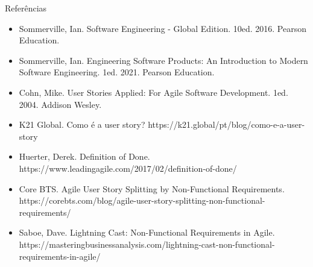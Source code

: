 \documentclass[11pt]{beamer}
\begin{document}
   \begin{frame}{Referências}
      \begin{itemize}
          \item Sommerville, Ian. Software Engineering - Global Edition. 10ed. 2016. Pearson Education.
          \item Sommerville, Ian. Engineering Software Products: An Introduction to Modern Software Engineering. 1ed. 2021. Pearson Education. 
          \item Cohn, Mike. User Stories Applied: For Agile Software Development. 1ed. 2004. Addison Wesley.
          \item K21 Global. Como é a user story? https://k21.global/pt/blog/como-e-a-user-story
          \item Huerter, Derek. Definition of Done. https://www.leadingagile.com/2017/02/definition-of-done/
          \item Core BTS. Agile User Story Splitting by Non-Functional Requirements. https://corebts.com/blog/agile-user-story-splitting-non-functional-requirements/
          \item Saboe, Dave. Lightning Cast: Non-Functional Requirements in Agile. https://masteringbusinessanalysis.com/lightning-cast-non-functional-requirements-in-agile/
      \end{itemize}
    \end{frame}
\end{document}
